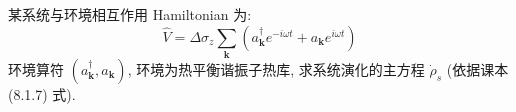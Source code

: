 \documentclass{assignment}
\begin{document}
\begin{prob}
    某系统与环境相互作用 Hamiltonian 为:
    \[
        \hat{V}=\Delta\sigma_z\sum_{\bm{k}}(a_{\bm{k}}^{\dagger}e^{-i\omega t}+a_{\bm{k}}e^{i\omega t})
    \]
    环境算符 $(a_{\bm{k}}^{\dagger},a_{\bm{k}})$, 环境为热平衡谐振子热库, 求系统演化的主方程 $\dot{\rho}_{s}$ (依据课本 (8.1.7) 式).
\end{prob}
\begin{sol}
    
\end{sol}
\end{document}
